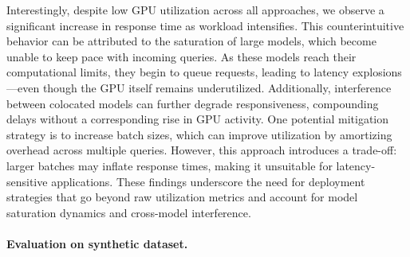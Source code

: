 Interestingly, despite low GPU utilization across all approaches, we observe a significant increase in response time as workload intensifies. This counterintuitive behavior can be attributed to the saturation of large models, which become unable to keep pace with incoming queries. As these models reach their computational limits, they begin to queue requests, leading to latency explosions—even though the GPU itself remains underutilized. Additionally, interference between colocated models can further degrade responsiveness, compounding delays without a corresponding rise in GPU activity. One potential mitigation strategy is to increase batch sizes, which can improve utilization by amortizing overhead across multiple queries. However, this approach introduces a trade-off: larger batches may inflate response times, making it unsuitable for latency-sensitive applications. These findings underscore the need for deployment strategies that go beyond raw utilization metrics and account for model saturation dynamics and cross-model interference.


\paragraph{Evaluation on synthetic dataset.}

